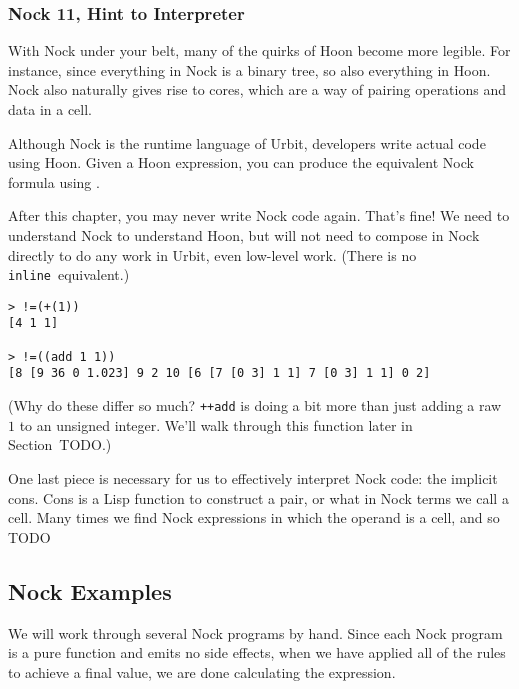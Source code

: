 \subsubsection[Nock 11]{Nock 11, Hint to Interpreter}


With Nock under your belt, many of the quirks of Hoon become more legible.  For instance, since everything in Nock is a binary tree, so also everything in Hoon.  Nock also naturally gives rise to cores, which are a way of pairing operations and data in a cell.

Although Nock is the runtime language of Urbit, developers write actual code using Hoon.  Given a Hoon expression, you can produce the equivalent Nock formula using \pzaptis.

After this chapter, you may never write Nock code again.  That's fine!  We need to understand Nock to understand Hoon, but will not need to compose in Nock directly to do any work in Urbit, even low-level work.  (There is no \texttt{inline}~equivalent.)

\begin{lstlisting}[style=nonumbers]
> !=(+(1))
[4 1 1]

> !=((add 1 1))
[8 [9 36 0 1.023] 9 2 10 [6 [7 [0 3] 1 1] 7 [0 3] 1 1] 0 2]
\end{lstlisting}

(Why do these differ so much?  \texttt{++add} is doing a bit more than just adding a raw $1$ to an unsigned integer.  We'll walk through this function later in Section~TODO.)


One last piece is necessary for us to effectively interpret Nock code:  the implicit cons.  Cons is a Lisp function to construct a pair, or what in Nock terms we call a cell.  Many times we find Nock expressions in which the operand is a cell, and so TODO

\subsection{Nock Examples}

We will work through several Nock programs by hand.  Since each Nock program is a pure function and emits no side effects, when we have applied all of the rules to achieve a final value, we are done calculating the expression.

